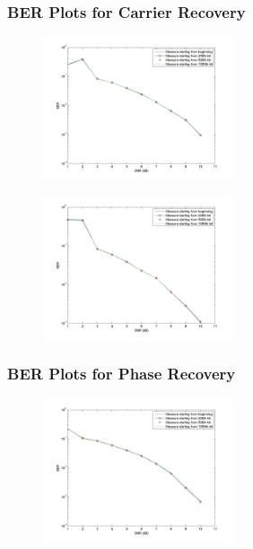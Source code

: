 \documentclass[]{article}
\begin{document}
\subsubsection{BER Plots for Carrier Recovery}
\begin{figure}[H]
\centering
\hspace*{-2cm}\includegraphics[width=0.5\textwidth]{qpBERfo_costas1.jpg}
\caption{}
\end{figure}

\begin{figure}[H]
\centering
\hspace*{-2cm}\includegraphics[width=0.5\textwidth]{qpBERfo_costas2.jpg}
\caption{}
\end{figure}

\subsubsection{BER Plots for Phase Recovery}
\begin{figure}[H]
\centering
\hspace*{-2cm}\includegraphics[width=0.5\textwidth]{qpBERpo_costas1.jpg}
\caption{}
\end{figure}
\end{document}
